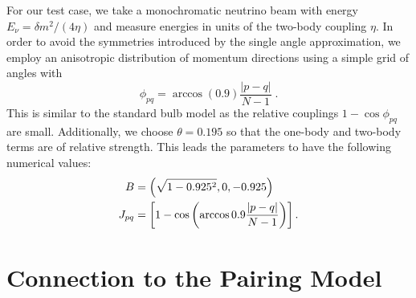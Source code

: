 \documentclass[Dual]{msu-thesis}
\begin{document}
For our test case, we take a monochromatic neutrino beam with energy $E_\nu=\delta m^2/(4\eta)$ and measure energies in units of the two-body coupling $\eta$. In order to avoid the symmetries introduced by the single angle approximation, we employ an anisotropic distribution of momentum directions
using a simple grid of angles with
\begin{equation}
\phi_{pq} = \arccos(0.9) \frac{|p-q|}{N-1}\;.
\end{equation}
This is similar to the standard bulb model as the relative couplings $1- \cos\phi_{pq}$ are small. Additionally, we choose $\theta=0.195$ so that the one-body and two-body terms are of relative strength. This leads the parameters to have the following numerical values:
\begin{align}
B&=\left(\sqrt{1-0.925^2},0,-0.925\right)
\\
J_{pq}&=\left[1-\cos\left(\arccos{0.9}\frac{\abs{p-q}}{N-1}\right)\right]
.\end{align}

\section{Connection to the Pairing Model}
\end{document}
